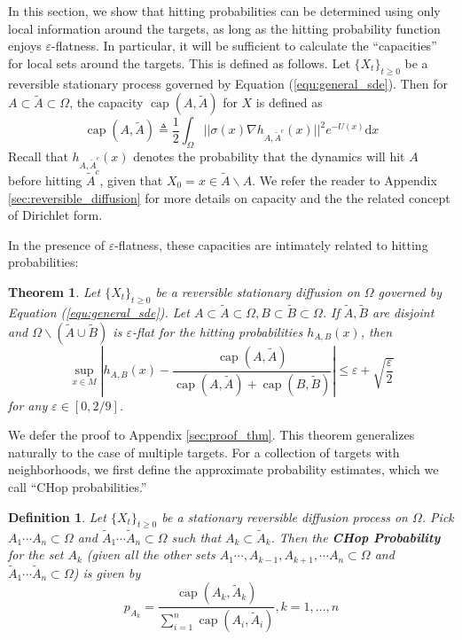 \documentclass[english, aip, jcp, priprint, graphicx,floatfix]{revtex4-1}
\newtheorem{definition}{Definition}
\newtheorem{theorem}{Theorem}
\theoremstyle{plain}
\theoremstyle{definition}
\theoremstyle{plain}
\begin{document}
In this section, we show that hitting probabilities can be determined using only local information around the targets, as long as the hitting probability function enjoys $\varepsilon$-flatness.  In particular, it will be sufficient to calculate the ``capacities'' for local sets around the targets.  This is defined as follows.  Let $\{X_t\}_{t\geq 0}$ be a reversible stationary process governed by Equation (\ref{equ:general_sde}).  Then for $A \subset \tilde{A} \subset \Omega$, the capacity $\ensuremath{\operatorname{cap}} (A, \tilde{A})$ for $X$ is defined as
%
\[ \ensuremath{\operatorname{cap}} (A, \tilde{A}) \triangleq \frac{1}{2} \int_{\Omega}
||\sigma(x) \nabla h_{A, \tilde{A}^c}(x)||^2 e^{- U(x)} \mathrm{d} x \]
%
Recall that $h_{A, \tilde{A}^c}(x)$ denotes the probability that the dynamics will hit $A$ before hitting $\tilde{A}^c$, given that $X_0=x \in \tilde A\backslash A$.  We refer the reader to Appendix \ref{sec:reversible_diffusion} for more details on capacity and the the related concept of Dirichlet form.

In the presence of $\varepsilon$-flatness, these capacities are intimately related to hitting probabilities:

\begin{theorem}\label{thm:main_thm}  Let $\{X_t\}_{t\geq 0}$ be a reversible stationary diffusion on $\Omega$ governed by Equation (\ref{equ:general_sde}).  Let $A\subset\tilde A\subset\Omega,B\subset\tilde B\subset\Omega$.  If $\tilde A,\tilde B$ are disjoint and $\Omega \backslash (\tilde A \cup \tilde B)$ is $\varepsilon$-flat for the hitting probabilities $h_{A,B}(x)$, then 
\[ \sup_{x \in M} \left| h_{A,B} (x) - \frac{\ensuremath{\operatorname{cap}} (A,
\tilde{A})}{\ensuremath{\operatorname{cap}} (A, \tilde{A})
+\ensuremath{\operatorname{cap}} (B, \tilde{B})} \right| \leqslant
\varepsilon + \sqrt{\frac{\varepsilon}{2}} \]
for any $\varepsilon \in[0,2/9]$.
\end{theorem}

We defer the proof to Appendix \ref{sec:proof_thm}. This theorem generalizes naturally to the case of multiple targets.  For a collection of targets with neighborhoods, we first define the approximate probability estimates, which we call ``CHop probabilities.''

\begin{definition}
Let $\{X_t\}_{t\geq 0}$ be a stationary reversible diffusion process on $\Omega$.  Pick $A_1\cdots A_n \subset \Omega$ and $\tilde A_1\cdots \tilde A_n \subset \Omega$ such that $A_k \subset \tilde A_k$.  Then the \textbf{CHop Probability} for the set $A_k$ (given all the other sets $A_1\cdots, A_{k-1}, A_{k+1}, \cdots A_n \subset \Omega$ and $\tilde A_1\cdots \tilde A_n \subset \Omega$) is given by
\begin{equation*}
p_{A_k} = \frac{\ensuremath{\operatorname{cap}} (A_k, \tilde{A}_k)}{\sum_{i = 1}^n \ensuremath{\operatorname{cap}} (A_i, \tilde{A}_i)}, k=1,\dots, n
\end{equation*} 
\end{definition}
\end{document}
